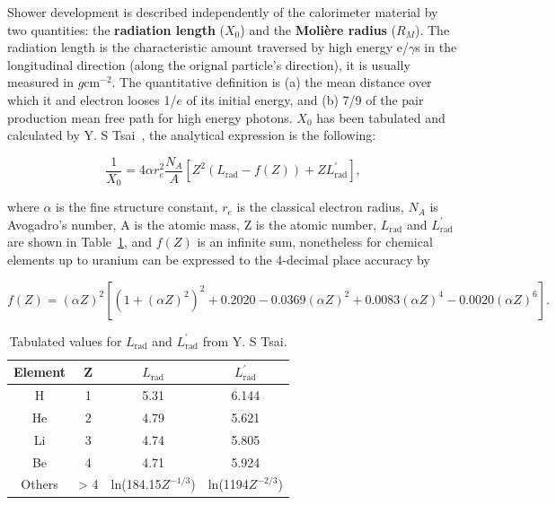 Shower development is described independently of the
calorimeter material by two quantities: the \textbf{radiation length}
($X_{0}$) and the \textbf{Moli\`ere radius} ($R_{M}$). The radiation length is the characteristic amount traversed by high energy
e/$\gamma$s in the longitudinal direction (along the orignal
particle's direction), it is usually measured in $g
\mathrm{cm}^{-2}$. The quantitative definition is (a) the
mean distance over which it  and electron looses 1/$e$ of its initial
energy, and (b) 7/9 of the pair production mean free path for high
energy photons. $X_{0}$ has been tabulated and calculated by Y. S
Tsai~\cite{}, the analytical expression is the following:

\begin{equation}
\frac{1}{X_{0}} = 4\alpha r^{2}_{e}\frac{N_{A}}{A}\left[ Z^{2}\left(
    L_{\mathrm{rad}} - f(Z)\right) + ZL^{'}_{\mathrm{rad}}\right],
\end{equation}

where $\alpha$ is the fine structure constant, $r_{e}$ is the classical
electron radius, $N_{A}$ is Avogadro's number, A is the atomic mass, Z
is the atomic number, $L_{\mathrm{rad}}$ and $L^{'}_{\mathrm{rad}}$
are shown in Table~\ref{tab:Lrad}, and $f(Z)$ is an infinite sum,
nonetheless for chemical elements up to uranium can be expressed to
the 4-decimal place accuracy by

\begin{equation}
f(Z) = (\alpha Z)^{2}\left[ (1+(\alpha Z)^{2})^{2} + 0.2020 - 0.0369
  (\alpha Z)^{2} + 0.0083(\alpha Z)^{4} - 0.0020 (\alpha Z)^{6}\right].
\end{equation}
 
\begin{table}[!ht]
\begin{center}
\caption{Tabulated values for $L_{\mathrm{rad}}$ and
  $L^{'}_{\mathrm{rad}}$ from Y. S Tsai.}
\label{tab:Lrad}
\begin{tabular}{cccc}
\hline
Element & Z & $L_{\mathrm{rad}}$ & $L^{'}_{\mathrm{rad}}$ \\
\hline
H & 1 & 5.31 & 6.144\\
He & 2 & 4.79 & 5.621\\
Li & 3 & 4.74& 5.805\\
Be & 4 & 4.71& 5.924\\
Others & > 4 & ln(184.15$Z^{-1/3}$) & ln(1194$Z^{-2/3}$)\\
\hline
\end{tabular}
\end{center}
\end{table}

